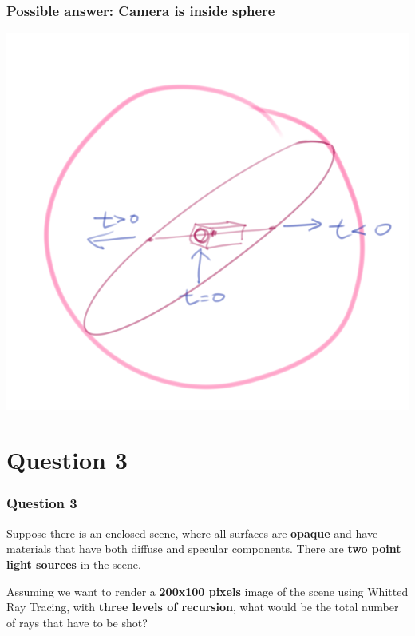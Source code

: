 \documentclass{beamer}
\begin{document}
\begin{frame}
    \frametitle{Possible answer: Camera is inside sphere}

    \begin{center}
        \includegraphics[scale=0.6]{q2.png}
    \end{center}

\end{frame}

\section{Question 3}

\begin{frame}
    \frametitle{Question 3}

    Suppose there is an enclosed scene, where all surfaces are \textbf{opaque} and have materials 
    that have both diffuse and specular components. There are \textbf{two point light sources} in the scene. 

    \vspace{1em}
    Assuming we want to render a \textbf{200x100 pixels} image of the scene using Whitted Ray Tracing, 
    with \textbf{three levels of recursion}, what would be the total number of rays that have to be shot?
\end{frame}
\end{document}

